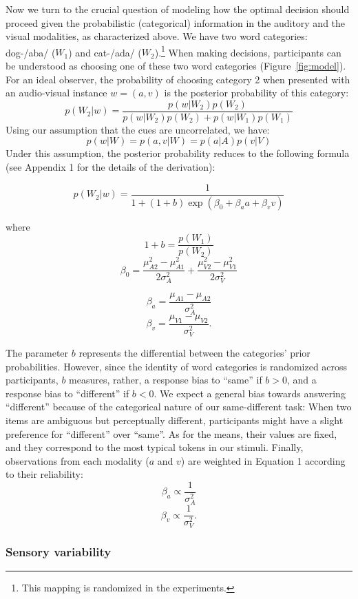 \documentclass[english,floatsintext,man]{apa6}
\theoremstyle{definition}
\theoremstyle{definition}
\theoremstyle{definition}
\theoremstyle{remark}
\begin{document}
Now we turn to the crucial question of modeling how the optimal decision
should proceed given the probabilistic (categorical) information in the
auditory and the visual modalities, as characterized above. We have two
word categories: dog-/aba/ (\(W_1\)) and cat-/ada/
(\(W_2\)).\footnote{This mapping is randomized in the experiments.} When
making decisions, participants can be understood as choosing one of
these two word categories (Figure~\ref{fig:model}). For an ideal
observer, the probability of choosing category 2 when presented with an
audio-visual instance \(w=(a,v)\) is the posterior probability of this
category: \[
p(W_2 | w)=\frac{p(w|W_2)p(W_2)}{p(w|W_2)p(W_2)+p(w|W_1)p(W_1)}
\] Using our assumption that the cues are uncorrelated, we have:
\[p(w | W) = p(a,v| W) = p(a| A)p(v| V)\] Under this assumption, the
posterior probability reduces to the following formula (see Appendix 1
for the details of the derivation):

\begin{equation}
 p(W_2 | w)=\frac{1}{1+(1+b)\exp(\beta_0+\beta_aa+\beta_vv)}
\end{equation}

where \[1+b=\frac{p(W_1)}{p(W_2)}\]
\[\beta_0=\frac{\mu^2_{A2}-\mu^2_{A1}}{2\sigma^2_{A}}+\frac{\mu^2_{V2}-\mu^2_{V1}}{2\sigma^2_{V}}\]

\[\beta_a=\frac{\mu_{A1}-\mu_{A2}}{\sigma^2_{A}}\]
\[\beta_v=\frac{\mu_{V1}-\mu_{V2}}{\sigma^2_{V}}.\]

The parameter \(b\) represents the differential between the categories'
prior probabilities. However, since the identity of word categories is
randomized across participants, \(b\) measures, rather, a response bias
to \enquote{same} if \(b > 0\), and a response bias to
\enquote{different} if \(b < 0\). We expect a general bias towards
answering \enquote{different} because of the categorical nature of our
same-different task: When two items are ambiguous but perceptually
different, participants might have a slight preference for
\enquote{different} over \enquote{same}. As for the means, their values
are fixed, and they correspond to the most typical tokens in our
stimuli. Finally, observations from each modality (\(a\) and \(v\)) are
weighted in Equation 1 according to their reliability:
\[\beta_a \propto \frac{1}{\sigma^2_{A}}\]
\[\beta_v \propto \frac{1}{\sigma^2_{V}}.\]

\subsubsection{Sensory variability}\label{sensory-variability}
\end{document}
